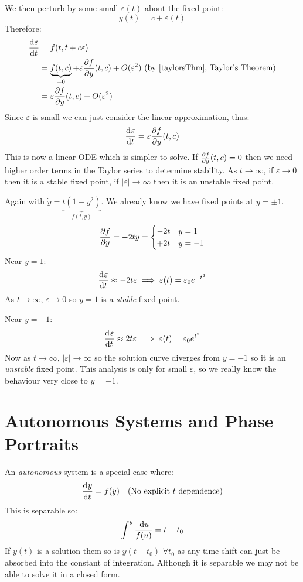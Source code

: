 \documentclass[../main.tex]{subfiles}
\begin{document}
We then perturb by some small $\varepsilon(t)$ about the fixed point:
\[
  y(t) = c + \varepsilon(t)
\]
Therefore:
\begin{align*}
  \deriv{\varepsilon}{t} &= f(t, t + c\varepsilon) \\
                         &= \underbrace{f(t, c)}_{=0} + \varepsilon \pderiv{f}{y}(t, c) + O(\varepsilon^2) \text{ (by \cref{taylorsThm}, Taylor's Theorem)}\\
                         &= \varepsilon \pderiv{f}{y}(t, c) + O(\varepsilon^2)
\end{align*}
Since $\varepsilon$ is small we can just consider the linear approximation, thus:
\[
  \deriv{\varepsilon}{t} = \varepsilon \pderiv{f}{y}(t, c)
\]
This is now a linear ODE which is simpler to solve.
If $\pderiv{f}{y}(t, c) = 0$ then we need higher order terms in the Taylor series to determine stability.
As $t \to \infty$, if $\varepsilon \to 0$ then it is a stable fixed point, if $|\varepsilon| \to \infty$ then it is an unstable fixed point.
\begin{example}
  Again with $\dot{y} = \underbrace{t(1 - y^2)}_{f(t, y)}$.
  We already know we have fixed points at $y = \pm 1$.
  \[
    \pderiv{f}{y} = -2ty = \begin{cases}
    -2t & y = 1 \\
    +2t & y = -1
    \end{cases}
  \]
  Near $y = 1$:
  \[
    \deriv{\varepsilon}{t} \approx -2t\varepsilon \implies
    \varepsilon(t) = \varepsilon_0 e^{-t^2}
  \]
  As $t \to \infty$, $\varepsilon \to 0$ so $y = 1$ is a \textit{stable} fixed point.

  Near $y = -1$:
  \[
    \deriv{\varepsilon}{t} \approx 2t\varepsilon \implies
    \varepsilon(t) = \varepsilon_0 e^{t^2}
  \]
  Now as $t \to \infty$, $|\varepsilon| \to \infty$ so the solution curve diverges from $y =-1$ so it is an \textit{unstable} fixed point.
  This analysis is only for small $\varepsilon$, so we really know the behaviour very close to $y = -1$.
\end{example}
\section{Autonomous Systems and Phase Portraits}
An \textit{autonomous} system is a special case where:
\[
  \deriv{y}{t} = f(y)\quad\text{(No explicit $t$ dependence)}
\]
This is separable so:
\[
  \int_{}^{y} \frac{\,\mathrm{d} u}{f(u)} = t - t_0
\]
If $y(t)$ is a solution them so is $y(t - t_0)$ $\forall t_0$ as any time shift can just be absorbed into the constant of integration.
Although it is separable we may not be able to solve it in a closed form.
\end{document}
